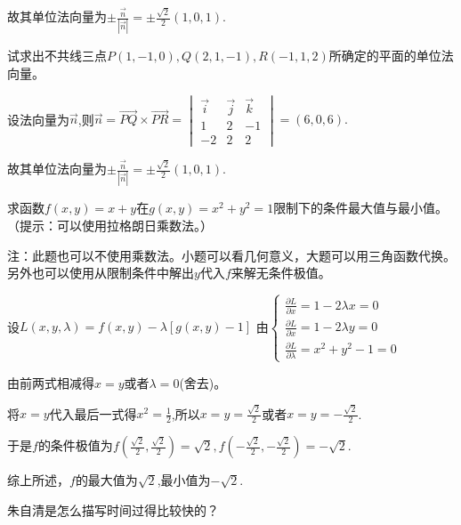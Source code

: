 \documentclass[addtable,twoside,12pt]{hnuexam}
\begin{document}
\begin{questions}
\begin{solution}
		故其单位法向量为$\pm\frac{\vec{n}}{|\vec{n}|}=\pm\frac{\sqrt{2}}{2}(1,0,1).$
	\end{solution}

	\question
		试求出不共线三点$P(1,-1,0),Q(2,1,-1),R(-1,1,2)$所确定的平面的单位法向量。
		\begin{solution}
			设法向量为$\vec{n}$,则$\vec{n}=\vec{PQ}\times\vec{PR}=\begin{vmatrix}
					\vec{i} & \vec{j} & \vec{k} \\
					1       & 2       & -1      \\
					-2      & 2       & 2
				\end{vmatrix}=(6,0,6).$
	
			故其单位法向量为$\pm\frac{\vec{n}}{|\vec{n}|}=\pm\frac{\sqrt{2}}{2}(1,0,1).$
		\end{solution}
		\vspace*{\stretch{1}}
	\clearpage

	\question
	求函数$f(x,y)=x+y$在$g(x,y)=x^2+y^2=1$限制下的条件最大值与最小值。（提示：可以使用拉格朗日乘数法。）
	\begin{solution}
		注：此题也可以不使用乘数法。小题可以看几何意义，大题可以用三角函数代换。另外也可以使用从限制条件中解出$y$代入$f$来解无条件极值。

		设$L(x,y,\lambda)=f(x,y)-\lambda [g(x,y)-1]$
		由$\begin{cases}
				\frac{\partial L}{\partial x}=1-2\lambda x=0 \\
				\frac{\partial L}{\partial x}=1-2\lambda y=0 \\
				\frac{\partial L}{\partial \lambda}=x^2+y^2-1=0
			\end{cases}$\score{4}

		由前两式相减得$x=y$或者$\lambda=0$(舍去)。\score{5}

		将$x=y$代入最后一式得$x^2=\frac{1}{2}$,所以$x=y=\frac{\sqrt{2}}{2}$或者$x=y=-\frac{\sqrt{2}}{2}$.\score{7}

		于是$f$的条件极值为$f(\frac{\sqrt{2}}{2},\frac{\sqrt{2}}{2})=\sqrt{2},f(-\frac{\sqrt{2}}{2},-\frac{\sqrt{2}}{2})=-\sqrt{2}.$\score{9}

		综上所述，$f$的最大值为$\sqrt{2}$,最小值为$-\sqrt{2}.$\score{10}
	\end{solution}

	\question
		朱自清是怎么描写时间过得比较快的？
\end{questions}
\end{document}
